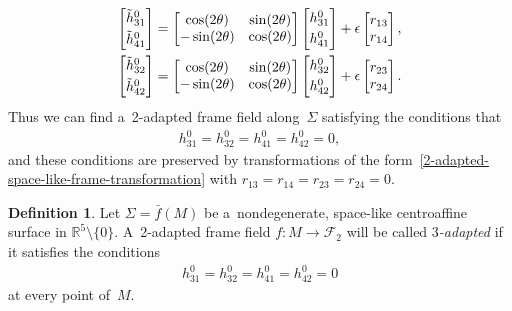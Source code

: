 \documentclass[10pt,a4paper]{amsart}
\numberwithin{equation}{section}
\theoremstyle{definition}
\newtheorem{dfn}[teo]{Definition}
\begin{document}
\begin{gather*}
\begin{bmatrix}
\tilde{h}^0_{31}
\vspace{1mm}\\
\tilde{h}^0_{41}
\end{bmatrix}
=
\begin{bmatrix}
\cos(2\theta) & \sin(2\theta)
\\
-\sin(2\theta) & \cos(2\theta)
\end{bmatrix}
\begin{bmatrix}
h^0_{31}
\vspace{1mm}\\
h^0_{41}
\end{bmatrix}
+ \epsilon
\begin{bmatrix}
r_{13}
\\
r_{14}
\end{bmatrix},
\\
\begin{bmatrix}
\tilde{h}^0_{32}
\vspace{1mm}\\
\tilde{h}^0_{42}
\end{bmatrix}
=
\begin{bmatrix}
\cos(2\theta) & \sin(2\theta)
\\
-\sin(2\theta) & \cos(2\theta)
\end{bmatrix}
\begin{bmatrix}
h^0_{32}
\vspace{1mm}\\
h^0_{42}
\end{bmatrix}
+ \epsilon
\begin{bmatrix}
r_{23}
\\
r_{24}
\end{bmatrix}.
\end{gather*}
Thus we can f\/ind a~2-adapted frame f\/ield along~$\Sigma$ satisfying the conditions that
\begin{gather*}
h^0_{31} = h^0_{32} = h^0_{41} = h^0_{42} = 0,
\end{gather*}
and these conditions are preserved by transformations of the form~\eqref{2-adapted-space-like-frame-transformation} with
$r_{13} = r_{14} = r_{23} = r_{24} = 0$.

\begin{dfn}
Let $\Sigma = \bar{f}(M)$ be a~nondegenerate, space-like centroaf\/f\/ine surface in $\mathbb{R}^5 \setminus \{0\}$.
A~2-adapted frame f\/ield $f:M \to \mathcal{F}_2$ will be called {\em $3$-adapted} if it satisf\/ies the conditions
\begin{gather}
h^0_{31} = h^0_{32} = h^0_{41} = h^0_{42} = 0
\label{3-adapted-space-like-h}
\end{gather}
at every point of~$M$.
\end{dfn}
\end{document}
